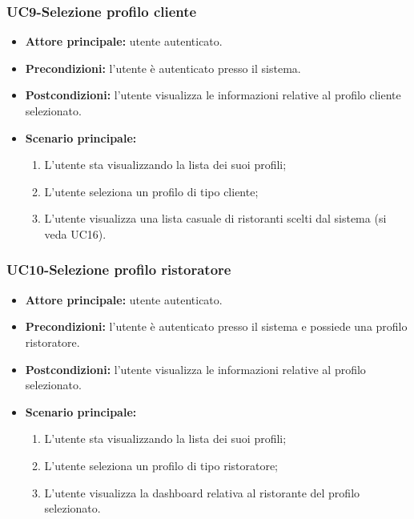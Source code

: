 \subsubsection{UC9-Selezione profilo cliente}
\begin{itemize}
\item \textbf{Attore principale:} utente autenticato.
\item \textbf{Precondizioni:} l'utente è autenticato presso il sistema.
\item \textbf{Postcondizioni:} l'utente visualizza le informazioni relative al profilo cliente selezionato.
\item \textbf{Scenario principale:}
\begin{enumerate}
    \item L'utente sta visualizzando la lista dei suoi profili;
    \item L'utente seleziona un profilo di tipo cliente;
    \item L'utente visualizza una lista casuale di ristoranti scelti dal sistema (si veda UC16).
\end{enumerate}
\end{itemize}

\subsubsection{UC10-Selezione profilo ristoratore}
\begin{itemize}
\item \textbf{Attore principale:} utente autenticato.
\item \textbf{Precondizioni:} l'utente è autenticato presso il sistema e possiede una profilo ristoratore.
\item \textbf{Postcondizioni:} l'utente visualizza le informazioni relative al profilo selezionato.
\item \textbf{Scenario principale:}
\begin{enumerate}
    \item L'utente sta visualizzando la lista dei suoi profili;
    \item L'utente seleziona un profilo di tipo ristoratore;
    \item L'utente visualizza la dashboard relativa al ristorante del profilo selezionato.
\end{enumerate}
\end{itemize}

